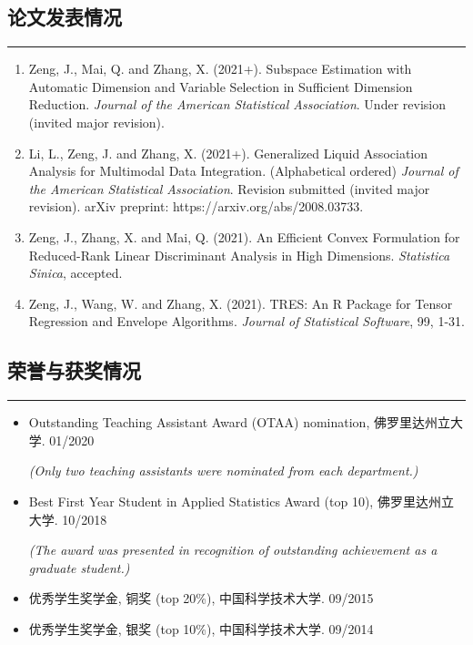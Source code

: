 \documentclass[10pt, oneside]{article}
\begin{document}
\subsection*{论文发表情况}
\noindent\rule{\textwidth}{1pt}
\begin{enumerate}[itemsep=0pt]
    \item Zeng, J., Mai, Q. and Zhang, X. (2021+). Subspace Estimation with Automatic Dimension and Variable Selection in Sufficient Dimension Reduction. \textit{Journal of the American Statistical Association}. Under revision (invited major revision).
    \item Li, L., Zeng, J. and Zhang, X. (2021+). Generalized Liquid Association Analysis for Multimodal Data Integration. (Alphabetical ordered) \textit{Journal of the American Statistical Association}. Revision submitted (invited major revision). arXiv preprint: https://arxiv.org/abs/2008.03733.
    \item Zeng, J., Zhang, X. and Mai, Q. (2021). An Efficient Convex Formulation for Reduced-Rank Linear Discriminant Analysis in High Dimensions. \textit{Statistica Sinica}, accepted.
    \item Zeng, J., Wang, W. and Zhang, X. (2021). TRES: An R Package for Tensor Regression and Envelope Algorithms. \textit{Journal of Statistical Software}, 99, 1-31.
\end{enumerate}

\subsection*{荣誉与获奖情况}
\noindent\rule{\textwidth}{1pt}
\begin{itemize}[itemsep=-1pt]
    \item Outstanding Teaching Assistant Award (OTAA) nomination, 佛罗里达州立大学. \hfill 01/2020

    \vspace{-0.5mm}
    \textit{(Only two teaching assistants were nominated from each department.)}
    \item Best First Year Student in Applied Statistics Award (top 10), 佛罗里达州立大学. \hfill 10/2018

    \vspace{-0.5mm}
    \textit{(The award was presented in recognition of outstanding achievement as a graduate student.)}
    \item 优秀学生奖学金, 铜奖 (top 20\%), 中国科学技术大学. \hfill 09/2015
    \item 优秀学生奖学金, 银奖 (top 10\%), 中国科学技术大学. \hfill 09/2014
\end{itemize}
\end{document}
